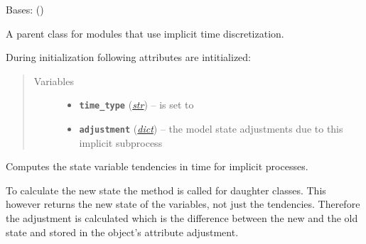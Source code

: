 \documentclass[a4paper,10pt,english]{sphinxmanual}
\begin{document}
\begin{fulllineitems}
\label{api/climlab.process:climlab.process.implicit.ImplicitProcess}
Bases: {\hyperref[api/climlab.process:climlab.process.time_dependent_process.TimeDependentProcess]{\emph{}}} ()

A parent class for modules that use implicit time discretization.

During initialization following attributes are intitialized:
\begin{quote}\begin{description}
\item[{Variables}] \leavevmode\begin{itemize}
\item {} 
\textbf{\texttt{time\_type}} (\href{http://docs.python.org/2.7/library/functions.html\#str}{\emph{str}}) -- is set to 

\item {} 
\textbf{\texttt{adjustment}} (\href{http://docs.python.org/2.7/library/stdtypes.html\#dict}{\emph{dict}}) -- the model state adjustments due to this implicit 
subprocess

\end{itemize}

\end{description}\end{quote}

\begin{fulllineitems}
\label{api/climlab.process:climlab.process.implicit.ImplicitProcess._compute}
Computes the state variable tendencies in time for implicit processes.

To calculate the new state the  method is 
called for daughter classes. This however returns the new state of the 
variables, not just the tendencies. Therefore the adjustment is 
calculated which is the difference between the new and the old state 
and stored in the object's attribute adjustment.


\end{fulllineitems}
\end{fulllineitems}
\end{document}

